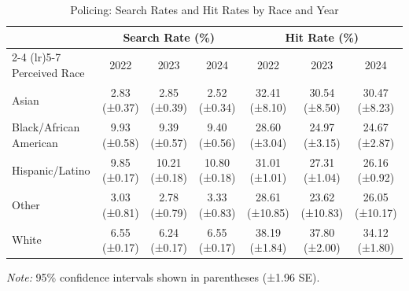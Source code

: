 \begin{table}[H]
\centering
\caption{Policing: Search Rates and Hit Rates by Race and Year}
\label{tab:search_hit_rates}
\begin{tabular}{l ccc ccc}
\toprule
 & \multicolumn{3}{c}{Search Rate (\%)} & \multicolumn{3}{c}{Hit Rate (\%)} \\
\cmidrule(lr){2-4} \cmidrule(lr){5-7}
Perceived Race & 2022 & 2023 & 2024 & 2022 & 2023 & 2024 \\
\midrule
Asian & 2.83 ({\scriptsize ±0.37}) & 2.85 ({\scriptsize ±0.39}) & 2.52 ({\scriptsize ±0.34}) & 32.41 ({\scriptsize ±8.10}) & 30.54 ({\scriptsize ±8.50}) & 30.47 ({\scriptsize ±8.23}) \\
Black/African American & 9.93 ({\scriptsize ±0.58}) & 9.39 ({\scriptsize ±0.57}) & 9.40 ({\scriptsize ±0.56}) & 28.60 ({\scriptsize ±3.04}) & 24.97 ({\scriptsize ±3.15}) & 24.67 ({\scriptsize ±2.87}) \\
Hispanic/Latino & 9.85 ({\scriptsize ±0.17}) & 10.21 ({\scriptsize ±0.18}) & 10.80 ({\scriptsize ±0.18}) & 31.01 ({\scriptsize ±1.01}) & 27.31 ({\scriptsize ±1.04}) & 26.16 ({\scriptsize ±0.92}) \\
Other & 3.03 ({\scriptsize ±0.81}) & 2.78 ({\scriptsize ±0.79}) & 3.33 ({\scriptsize ±0.83}) & 28.61 ({\scriptsize ±10.85}) & 23.62 ({\scriptsize ±10.83}) & 26.05 ({\scriptsize ±10.17}) \\
White & 6.55 ({\scriptsize ±0.17}) & 6.24 ({\scriptsize ±0.17}) & 6.55 ({\scriptsize ±0.17}) & 38.19 ({\scriptsize ±1.84}) & 37.80 ({\scriptsize ±2.00}) & 34.12 ({\scriptsize ±1.80}) \\
\bottomrule
\end{tabular}
\smallskip
\parbox{\textwidth}{\footnotesize \textit{Note:} 95\% confidence intervals shown in parentheses (±1.96 SE).}
\end{table}


